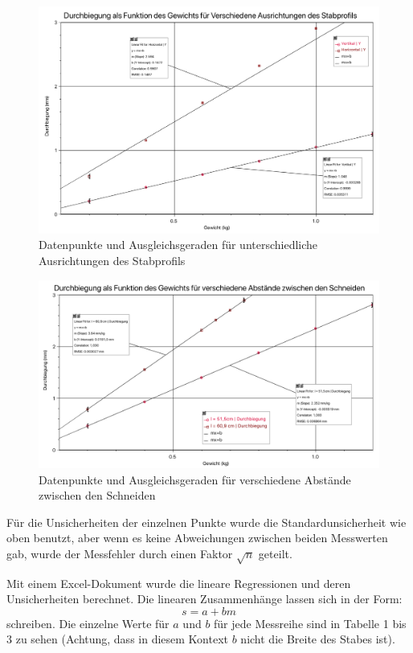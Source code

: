\documentclass[11pt,a4paper]{article}
\begin{document}
\begin{figure}[h]
	\centering
	\includegraphics[width=\linewidth]{Abb3}
	\caption{Datenpunkte und Ausgleichsgeraden für unterschiedliche Ausrichtungen des Stabprofils}
\end{figure}

\begin{figure}[h]
	\centering
	\includegraphics[width=\linewidth]{Abb4}
	\caption{Datenpunkte und Ausgleichsgeraden für verschiedene Abstände zwischen den Schneiden}
\end{figure}
\FloatBarrier

	Für die Unsicherheiten der einzelnen Punkte wurde die Standardunsicherheit wie oben benutzt, aber wenn es keine Abweichungen zwischen beiden Messwerten gab, wurde der Messfehler durch einen Faktor $\sqrt{n}$ geteilt. 

Mit einem Excel-Dokument wurde die lineare Regressionen und deren Unsicherheiten berechnet. Die linearen Zusammenhänge lassen sich in der Form: 
$$ s = a + bm $$ schreiben. Die einzelne Werte für $a$ und $b$ für jede Messreihe sind in Tabelle 1 bis 3 zu sehen (Achtung, dass in diesem Kontext $b$ nicht die Breite des Stabes ist). 
\end{document}
